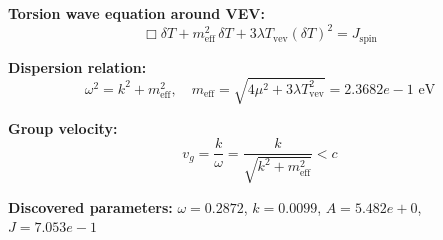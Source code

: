 
\textbf{Torsion wave equation around VEV:}
\begin{equation}
  \Box \delta T + m_{\text{eff}}^2 \, \delta T + 3\lambda T_{\text{vev}} (\delta T)^2 = J_{\text{spin}}
\end{equation}

\textbf{Dispersion relation:}
\begin{equation}
  \omega^2 = k^2 + m_{\text{eff}}^2, \quad
  m_{\text{eff}} = \sqrt{4\mu^2 + 3\lambda T_{\text{vev}}^2} = 2.3682e-1 \text{ eV}
\end{equation}

\textbf{Group velocity:}
\begin{equation}
  v_g = \frac{k}{\omega} = \frac{k}{\sqrt{k^2 + m_{\text{eff}}^2}} < c
\end{equation}

\textbf{Discovered parameters:}
$\omega = 0.2872$, \quad
$k = 0.0099$, \quad
$A = 5.482e+0$, \quad
$J = 7.053e-1$
